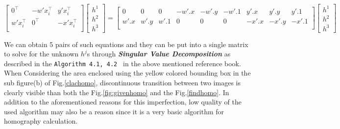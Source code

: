 \documentclass[a4paper,11pt]{article}%
\begin{document}
{\footnotesize
\begin{equation*}
	\begin{bmatrix}
		0^\top & -w\prime x_i^\top & y\prime x_i^\top\\
		w\prime x_i^\top	& 0^\top & -x\prime x_i^\top\\
	\end{bmatrix}
	\begin{bmatrix}
		h^1\\
		h^2\\
		h^3
	\end{bmatrix} =
	\begin{bmatrix}
		0& 0 &0 & -w\prime.x&-w\prime.y&-w\prime.1& y\prime.x & y\prime.y& y\prime.1\\
		w\prime.x&w\prime.y&w\prime.1& 0& 0 &0 & -x\prime.x& -x\prime.y& -x\prime.1\\
	\end{bmatrix}
	\begin{bmatrix}
		h^1\\
		h^2\\
		h^3
	\end{bmatrix}
\end{equation*}
}

We can obtain 5 pairs of such equations and they can be put into a single matrix to solve for the unknown  $h^j$s through \textbf{\textit{Singular Value Decomposition}} as described in the {\tt Algorithm 4.1, 4.2 } in the above mentioned reference book. When Considering the area enclosed using the yellow colored bounding box in the sub figure(b) of Fig.\ref{clachomo}, discontinuous transition between two images is clearly visible than both the Fig.\ref{fig:givenhomo} and the Fig.\ref{findhomo}. In addition to the aforementioned reasons for this imperfection, low quality of the used algorithm may also be a reason since it is a very basic algorithm for homography calculation. 
\end{document}
